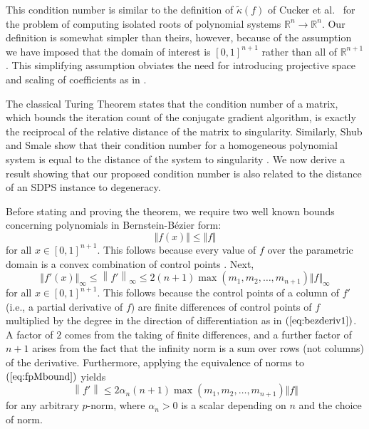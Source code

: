 \documentclass{article}
\newcommand{\norm}[1]{\left\|#1\right\|} \newcommand{\norma}[1]{\left\|#1\right\|}   \newcommand{\inv}[1]{#1^{-1}}
\newcommand\eref[1]{$(\ref{#1})$}
\newcommand\R{\mathbb{R}}
\begin{document}
This condition number is similar to the definition of
$\tilde \kappa(f)$  of Cucker et al.\ \cite{Cuckeretal} 
for the problem of computing isolated roots of polynomial
systems $\R^{n}\rightarrow\R^n$.
Our definition is somewhat simpler than theirs, however,
because
of the assumption we have imposed
that the domain of interest
is $[0,1]^{n+1}$ rather than all of $\mathbb{R}^{n+1}$.  This simplifying
assumption obviates the need for introducing projective
space and scaling of coefficients as in \cite{Cuckeretal}.

The classical Turing Theorem \cite{Chaitin} states that the condition
number of a matrix, which bounds the iteration count of the conjugate
gradient algorithm, is exactly the reciprocal of the relative distance
of the matrix to singularity.  Similarly, Shub and Smale show that
their condition number for a homogeneous polynomial system is equal to
the distance of the system to singularity \cite{shub}.  We now derive
a result showing that our proposed condition number is also related
to
the distance of an SDPS instance to degeneracy.

Before stating and proving the theorem, we
require two well known bounds concerning polynomials 
in Bernstein-B\'ezier form:
\begin{equation}
\Vert f(x)\Vert \le \Vert f\Vert
\label{eq:fMbound}
\end{equation}
for all $x\in[0,1]^{n+1}$.
This follows because every value of $f$ over the
parametric domain is a convex combination
of control points \cite{Farin}.
Next, 
\begin{equation}
\Vert f'(x)\Vert_\infty \le \norm{f'}_\infty \leq 2(n+1)\max(m_1, m_2, \ldots, m_{n+1})\Vert f\Vert_\infty
\label{eq:fpMbound}
\end{equation}
for all $x\in[0,1]^{n+1}$.
This follows because
the control points of a column of $f'$ (i.e., a partial derivative of $f$)
are finite differences of control points
of $f$ multiplied by the degree in the direction of differentiation
as in \eref{eq:bezderiv1}.  A
factor of $2$ comes from the taking of finite differences, and a further
factor of $n+1$ arises from the fact that the infinity norm is a sum
over rows (not columns) of the derivative.  Furthermore, applying the equivalence of norms to \eref{eq:fpMbound} yields
\begin{equation}
\label{eq:ebound}
\norm{f'} \leq 2\alpha_n(n+1)\max(m_1, m_2, \ldots, m_{n+1})\Vert f\Vert
\end{equation}
for any arbitrary $p$-norm, where $\alpha_n > 0$ is a scalar depending on $n$ and the choice of norm.
\end{document}
